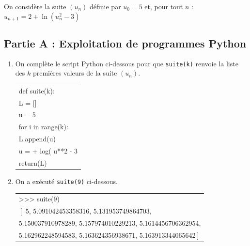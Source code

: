 
\medskip
	On considère la suite $(u_{n})$ définie par $u_{0}=5$ et, pour tout $n$ :
$u_{n+1}=2+\ln \left(u_{n}^{2}-3\right)$


	\subsection*{Partie A : Exploitation de programmes Python}

	\begin{enumerate}
		\item On complète le script Python ci-dessous pour que \texttt{suite(k)}  renvoie la liste des $k$ premières valeurs de la suite $(u_{n})$.

%

		\begin{center}
		\begin{ttfamily}
		\begin{tabularx}{0.6\linewidth}{|X|}\hline
			def suite(k):\\
			\quad	L = []\\
			\quad	u = 5\\
			\quad	for i in range({\blue k}):\\
			\qquad	L.append(u)\\
			\qquad	u = \blue 2 + log( u**2 - 3\\
			\quad	return({\blue L})\\ \hline
		\end{tabularx}
		\end{ttfamily}
		\end{center}
		
		\item On a exécuté \texttt{suite(9)} ci-dessous. 
		

\begin{center}
\begin{ttfamily}
\begin{tabularx}{\linewidth}{|X|}\hline
>{}>{}>{} suite(9) \\
$\left[\right.$ 5, 5.091042453358316, 5.131953749864703,\\
5.150037910978289, 5.157974010229213, 5.1614456706362954,\\
5.162962248594583, 5.163624356938671, 5.163913344065642$\left.\right]$\\ \hline
\end{tabularx}
\end{ttfamily}
\end{center}


\end{enumerate}
